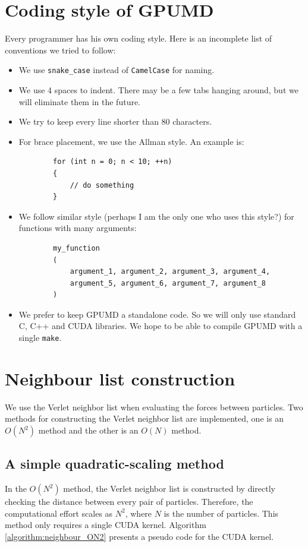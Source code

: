 \documentclass[12pt,a4paper]{report}
\begin{document}
\section{Coding style of GPUMD}

Every programmer has his own coding style. Here is an incomplete list of conventions we tried to follow:
\begin{itemize}
\item We use \verb"snake_case" instead of \verb"CamelCase" for naming.
\item We use 4 spaces to indent. There may be a few tabs hanging around, but we will eliminate them in the future.
\item We try to keep every line shorter than 80 characters.
\item For brace placement, we use the Allman style. An example is:
    \begin{verbatim}
        for (int n = 0; n < 10; ++n) 
        {
            // do something
        }
    \end{verbatim}
\item We follow similar style (perhaps I am the only one who uses this style?) for functions with many arguments:
    \begin{verbatim}
        my_function
        (
            argument_1, argument_2, argument_3, argument_4, 
            argument_5, argument_6, argument_7, argument_8
        )
    \end{verbatim}
\item We prefer to keep GPUMD a standalone code. So we will only use standard C, C++ and CUDA libraries. We hope to be able to compile GPUMD with a single \verb"make".
\end{itemize}


\section{Neighbour list construction}


We use the Verlet neighbor list when evaluating the forces between particles. Two methods for constructing the Verlet neighbor list are implemented, one is an $O(N^2)$ method and the other is an $O(N)$ method.


\subsection{A simple quadratic-scaling method}

In the $O(N^2)$ method, the Verlet neighbor list is constructed by directly checking the distance between every pair of particles. Therefore, the computational effort scales as $N^2$, where $N$ is the number of particles. This method only requires a single CUDA kernel.
Algorithm \ref{algorithm:neighbour_ON2} presents a pseudo code for the CUDA kernel.
\end{document}
